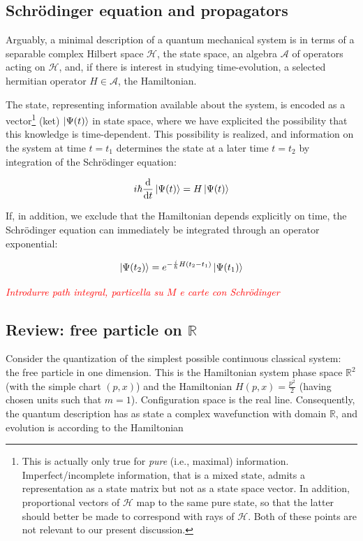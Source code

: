 \documentclass{article}
\newcommand{\ar}{\ensuremath{\mathbb{R}}}
\newcommand{\hil}{\ensuremath{\mathcal{H}}}
\newcommand{\cmnt}[1]{\textcolor{red}{\emph{#1}}}
\begin{document}
\subsection{Schr\"odinger equation and propagators}

Arguably, a minimal description of a quantum mechanical system is in terms of a separable complex Hilbert space $\hil$, the state space, an algebra $\mathcal{A}$ of operators acting on $\hil$, and, if there is interest in studying time-evolution, a selected hermitian operator $H \in \mathcal{A}$, the Hamiltonian.  

The state, representing information available about the system, is encoded as a vector\footnote{This is actually only true for \emph{pure} (i.e., maximal) information. Imperfect/incomplete information, that is a mixed state, admits a representation as a state matrix but not as a state space vector. In addition, proportional vectors of $\hil$ map to the same pure state, so that the latter should better be made to correspond with rays of $\hil$. Both of these points are not relevant to our present discussion.} (ket) $\ket{\Psi(t)}$ in state space, where we have explicited the possibility that this knowledge is time-dependent. This possibility is realized, and information on the system at time $t=t_1$ determines the state at a later time $t=t_2$ by integration of the Schr\"odinger equation:

\begin{equation}
    i \hbar \dv{t}\ket{\Psi(t)} = H \ket{\Psi(t)}
\end{equation}


If, in addition, we exclude that the Hamiltonian depends explicitly on time, the Schr\"odinger equation can immediately be integrated through an operator exponential:

\begin{equation}
    \ket{\Psi(t_2)} = e^{-\frac{i}{\hbar} H (t_2-t_1)} \ket{\Psi(t_1)} 
\end{equation}


\cmnt{Introdurre path integral, particella su $M$ e carte con Schr\"odinger}

\subsection{Review: free particle on $\mathbb{R}$}

Consider the quantization of the simplest possible continuous classical system: the free particle in one dimension. This is the Hamiltonian system phase space $\ar^2$ (with the simple chart $(p,x)$) and the Hamiltonian $H(p,x) = \frac{p^2}{2}$ (having chosen units such that $m=1$). Configuration space is the real line. Consequently, the quantum description has as state a complex wavefunction with domain $\ar$, and evolution is according to the Hamiltonian
\end{document}
